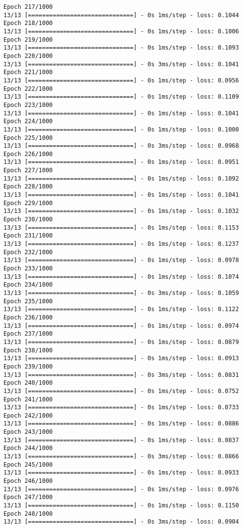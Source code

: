 \documentclass[11pt]{article}
\begin{document}
\begin{Verbatim}[commandchars=\\\{\}]
Epoch 217/1000
13/13 [==============================] - 0s 1ms/step - loss: 0.1044
Epoch 218/1000
13/13 [==============================] - 0s 1ms/step - loss: 0.1006
Epoch 219/1000
13/13 [==============================] - 0s 1ms/step - loss: 0.1093
Epoch 220/1000
13/13 [==============================] - 0s 3ms/step - loss: 0.1041
Epoch 221/1000
13/13 [==============================] - 0s 1ms/step - loss: 0.0956
Epoch 222/1000
13/13 [==============================] - 0s 1ms/step - loss: 0.1109
Epoch 223/1000
13/13 [==============================] - 0s 1ms/step - loss: 0.1041
Epoch 224/1000
13/13 [==============================] - 0s 1ms/step - loss: 0.1000
Epoch 225/1000
13/13 [==============================] - 0s 3ms/step - loss: 0.0968
Epoch 226/1000
13/13 [==============================] - 0s 1ms/step - loss: 0.0951
Epoch 227/1000
13/13 [==============================] - 0s 1ms/step - loss: 0.1092
Epoch 228/1000
13/13 [==============================] - 0s 1ms/step - loss: 0.1041
Epoch 229/1000
13/13 [==============================] - 0s 1ms/step - loss: 0.1032
Epoch 230/1000
13/13 [==============================] - 0s 1ms/step - loss: 0.1153
Epoch 231/1000
13/13 [==============================] - 0s 1ms/step - loss: 0.1237
Epoch 232/1000
13/13 [==============================] - 0s 1ms/step - loss: 0.0978
Epoch 233/1000
13/13 [==============================] - 0s 1ms/step - loss: 0.1074
Epoch 234/1000
13/13 [==============================] - 0s 3ms/step - loss: 0.1059
Epoch 235/1000
13/13 [==============================] - 0s 1ms/step - loss: 0.1122
Epoch 236/1000
13/13 [==============================] - 0s 1ms/step - loss: 0.0974
Epoch 237/1000
13/13 [==============================] - 0s 1ms/step - loss: 0.0879
Epoch 238/1000
13/13 [==============================] - 0s 1ms/step - loss: 0.0913
Epoch 239/1000
13/13 [==============================] - 0s 3ms/step - loss: 0.0831
Epoch 240/1000
13/13 [==============================] - 0s 1ms/step - loss: 0.0752
Epoch 241/1000
13/13 [==============================] - 0s 1ms/step - loss: 0.0733
Epoch 242/1000
13/13 [==============================] - 0s 1ms/step - loss: 0.0886
Epoch 243/1000
13/13 [==============================] - 0s 1ms/step - loss: 0.0837
Epoch 244/1000
13/13 [==============================] - 0s 3ms/step - loss: 0.0866
Epoch 245/1000
13/13 [==============================] - 0s 1ms/step - loss: 0.0933
Epoch 246/1000
13/13 [==============================] - 0s 1ms/step - loss: 0.0976
Epoch 247/1000
13/13 [==============================] - 0s 1ms/step - loss: 0.1150
Epoch 248/1000
13/13 [==============================] - 0s 3ms/step - loss: 0.0904

\end{Verbatim}
\end{document}
